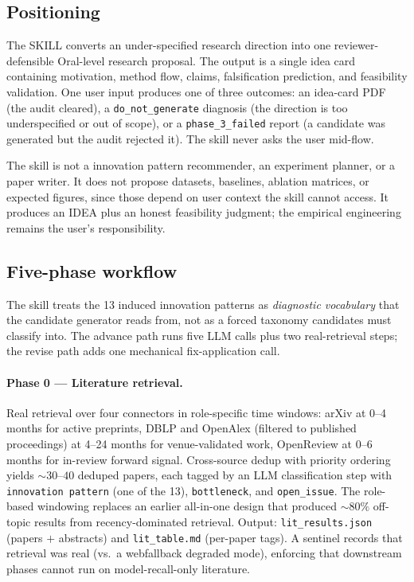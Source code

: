 \documentclass[10pt,a4paper]{article}
\begin{document}
\subsection{Positioning}
\label{subsec:skill-positioning}

The SKILL converts an under-specified research direction into one reviewer-defensible Oral-level research proposal. The output is a single idea card containing motivation, method flow, claims, falsification prediction, and feasibility validation. One user input produces one of three outcomes: an idea-card PDF (the audit cleared), a \texttt{do\_not\_generate} diagnosis (the direction is too underspecified or out of scope), or a \texttt{phase\_3\_failed} report (a candidate was generated but the audit rejected it). The skill never asks the user mid-flow.

The skill is not a innovation pattern recommender, an experiment planner, or a paper writer. It does not propose datasets, baselines, ablation matrices, or expected figures, since those depend on user context the skill cannot access. It produces an IDEA plus an honest feasibility judgment; the empirical engineering remains the user's responsibility.

\subsection{Five-phase workflow}
\label{subsec:skill-workflow}

The skill treats the 13 induced innovation patterns as \emph{diagnostic vocabulary} that the candidate generator reads from, not as a forced taxonomy candidates must classify into. The advance path runs five LLM calls plus two real-retrieval steps; the revise path adds one mechanical fix-application call.

\paragraph{Phase 0 --- Literature retrieval.} Real retrieval over four connectors in role-specific time windows: arXiv at 0--4 months for active preprints, DBLP and OpenAlex (filtered to published proceedings) at 4--24 months for venue-validated work, OpenReview at 0--6 months for in-review forward signal. Cross-source dedup with priority ordering yields ${\sim}30$--$40$ deduped papers, each tagged by an LLM classification step with \texttt{innovation pattern} (one of the 13), \texttt{bottleneck}, and \texttt{open\_issue}. The role-based windowing replaces an earlier all-in-one design that produced ${\sim}80\%$ off-topic results from recency-dominated retrieval. Output: \texttt{lit\_results.json} (papers $+$ abstracts) and \texttt{lit\_table.md} (per-paper tags). A sentinel records that retrieval was real (vs.\ a webfallback degraded mode), enforcing that downstream phases cannot run on model-recall-only literature.
\end{document}
